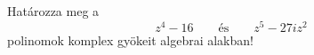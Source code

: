 \documentclass[11pt]{scrartcl}
\begin{document}
Határozza meg a
\[
	z^4 - 16 \qquad \text{és} \qquad z^5 - 27i z^2
\]
polinomok komplex gyökeit algebrai alakban!
\end{document}
